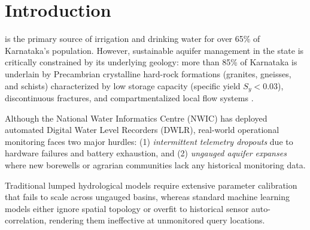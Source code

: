 \documentclass[10pt,journal,compsoc]{IEEEtran}
\begin{document}
\maketitle
\IEEEdisplaynontitleabstractindextext
\IEEEpeerreviewmaketitle

\section{Introduction}
 is the primary source of irrigation and drinking water for over 65\% of Karnataka's population. However, sustainable aquifer management in the state is critically constrained by its underlying geology: more than 85\% of Karnataka is underlain by Precambrian crystalline hard-rock formations (granites, gneisses, and schists) characterized by low storage capacity (specific yield $S_y < 0.03$), discontinuous fractures, and compartmentalized local flow systems \cite{cgwb2022dynamic}. 

Although the National Water Informatics Centre (NWIC) has deployed automated Digital Water Level Recorders (DWLR), real-world operational monitoring faces two major hurdles: (1) \textit{intermittent telemetry dropouts} due to hardware failures and battery exhaustion, and (2) \textit{ungauged aquifer expanses} where new borewells or agrarian communities lack any historical monitoring data.

Traditional lumped hydrological models require extensive parameter calibration that fails to scale across ungauged basins, whereas standard machine learning models either ignore spatial topology or overfit to historical sensor auto-correlation, rendering them ineffective at unmonitored query locations.
\end{document}
